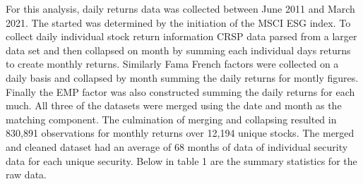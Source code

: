 For this analysis, daily returns data was collected between June 2011 and March 2021. The started was determined by the initiation of the MSCI ESG index. To collect daily individual stock return information CRSP data parsed from a larger data set and then collapsed on month by summing each individual days returns to create monthly returns. Similarly Fama French factors were collected on a daily basis and collapsed by month summing the daily returns for montly figures. Finally the EMP factor was also  constructed summing the daily returns for each much. All three of the datasets were merged using the date and month as the matching component. The culmination of merging and collapsing resulted in  830,891 observations for monthly returns over  12,194 unique stocks. The merged and cleaned dataset had an average of 68 months of data of individual security data for each unique security. Below in table 1 are the summary statistics for the raw data.
